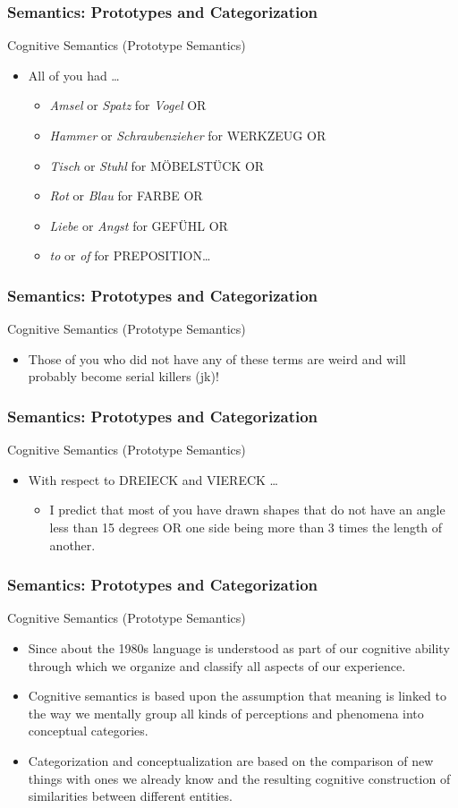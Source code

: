 \documentclass[12pt, table]{beamer}
\begin{document}
\begin{frame}
\frametitle{Semantics: Prototypes and Categorization}
Cognitive Semantics (Prototype Semantics)
\begin{itemize}
\item All of you had \dots
\begin{itemize}
\item \textit{Amsel} or \textit{Spatz} for \textit{Vogel} OR
\item \textit{Hammer} or \textit{Schraubenzieher} for WERKZEUG OR
\item \textit{Tisch} or \textit{Stuhl} for M{\"O}BELST{\"U}CK OR
\item \textit{Rot} or \textit{Blau} for FARBE OR
\item \textit{Liebe} or \textit{Angst} for GEF{\"U}HL OR
\item \textit{to} or \textit{of} for PREPOSITION\dots
\end{itemize}
\end{itemize}
\end{frame}

\begin{frame}
\frametitle{Semantics: Prototypes and Categorization}
Cognitive Semantics (Prototype Semantics)
\begin{itemize}
\item Those of you who did not have any of these terms are weird and will probably become serial killers (jk)!
\end{itemize}
\end{frame}

\begin{frame}
\frametitle{Semantics: Prototypes and Categorization}
Cognitive Semantics (Prototype Semantics)
\begin{itemize}
\item With respect to DREIECK and VIERECK \dots
\begin{itemize}
\item I predict that most of you have drawn shapes that do not have an angle less than 15 degrees OR one side being more than 3 times the length of another.
\end{itemize}
\end{itemize}
\end{frame}

\begin{frame}
\frametitle{Semantics: Prototypes and Categorization}
Cognitive Semantics (Prototype Semantics)
\begin{itemize}
\item Since about the 1980s language is understood as part of our cognitive ability through which we organize and classify all aspects of our experience.
\item Cognitive semantics is based upon the assumption that meaning is linked to the way we mentally group all kinds of perceptions and phenomena into conceptual categories.
\item Categorization and conceptualization are based on the comparison of new things with ones we already know and the resulting cognitive construction of similarities between different entities.
\end{itemize}
\end{frame}
\end{document}
